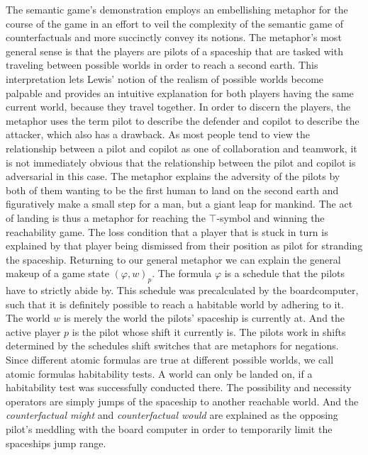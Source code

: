 \documentclass[a4paper,american,10pt]{paper}
\theoremstyle{definition}\newtheorem{definition}{Definition}
\begin{document}
The semantic game's demonstration employs an embellishing metaphor for the course of the game in an effort to veil the complexity of the semantic game of counterfactuals and more succinctly convey its notions. The metaphor's most general sense is that the players are pilots of a spaceship that are tasked with traveling between possible worlds in order to reach a second earth. This interpretation lets Lewis' notion of the realism of possible worlds become palpable and provides an intuitive explanation for both players having the same current world, because they travel together. In order to discern the players, the metaphor uses the term pilot to describe the defender and copilot to describe the attacker, which also has a drawback. As most people tend to view the relationship between a pilot and copilot as one of collaboration and teamwork, it is not immediately obvious that the relationship between the pilot and copilot is adversarial in this case. The metaphor explains the adversity of the pilots by both of them wanting to be the first human to land on the second earth and figuratively make a small step for a man, but a giant leap for mankind. The act of landing is thus a metaphor for reaching the $\top$-symbol and winning the reachability game. The loss condition that a player that is stuck in turn is explained by that player being dismissed from their position as pilot for stranding the spaceship. Returning to our general metaphor we can explain the general makeup of a game state $(\varphi, w)_p$. The formula $\varphi$ is a schedule that the pilots have to strictly abide by. This schedule was precalculated by the boardcomputer, such that it is definitely possible to reach a habitable world by adhering to it. The world $w$ is merely the world the pilots' spaceship is currently at. And the active player $p$ is the pilot whose shift it currently is. The pilots work in shifts determined by the schedules shift switches that are metaphors for negations. Since different atomic formulas are true at different possible worlds, we call atomic formulas habitability tests. A world can only be landed on, if a habitability test was successfully conducted there. The possibility and necessity operators are simply jumps of the spaceship to another reachable world. And the \textit{counterfactual might} and \textit{counterfactual would} are explained as the opposing pilot's meddling with the board computer in order to temporarily limit the spaceships jump range.
\end{document}
